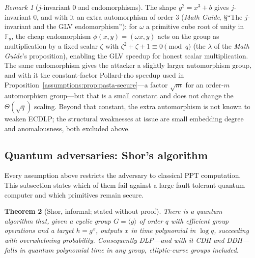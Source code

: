 \documentclass[11pt,a4paper]{article}
\newtheorem{theorem}{Theorem}[section]
\theoremstyle{definition}
\theoremstyle{remark}
\newtheorem{remark}[theorem]{Remark}
\newcommand{\Fp}{\ensuremath{\mathbb{F}_{p}}}
\begin{document}
\begin{remark}[\(j\)-invariant \(0\) and endomorphisms]
\label{assumptions:rem:j0}
The shape \(y^{2} = x^{3} + b\) gives \(j\)-invariant \(0\), and
with it an extra automorphism of order \(3\) (\emph{Math Guide},
\S``The \(j\)-invariant and the GLV endomorphism''): for \(\omega\) a
primitive cube root of unity in \(\Fp\), the cheap endomorphism
\(\phi(x, y) = (\omega x, y)\) acts on the group as multiplication
by a fixed scalar \(\zeta\) with
\(\zeta^{2} + \zeta + 1 \equiv 0 \pmod q\) (the \(\lambda\) of the
\emph{Math Guide}'s proposition), enabling the GLV speedup for honest
scalar multiplication. The same endomorphism gives the attacker a
slightly larger automorphism group, and with it the constant-factor
Pollard-rho speedup used in
Proposition~\ref{assumptions:prop:pasta-secure}---a factor \(\sqrt m\)
for an order-\(m\) automorphism group---but that is a small constant
and does not change the \(\Theta(\sqrt q)\) scaling. Beyond that
constant, the extra automorphism is not known to weaken ECDLP; the
structural weaknesses at issue are small embedding degree and
anomalousness, both excluded above.
\end{remark}

\subsection{Quantum adversaries: Shor's algorithm}
\label{assumptions:subsec:quantum}

Every assumption above restricts the adversary to classical PPT
computation. This subsection states which of them fail against a
large fault-tolerant quantum computer and which primitives remain
secure.

\begin{theorem}[Shor, informal; stated without proof]
\label{assumptions:thm:shor}
There is a quantum algorithm that, given a cyclic group
\(G = \langle g\rangle\) of order \(q\) with efficient group
operations and a target \(h = g^{x}\), outputs \(x\) in time
polynomial in \(\log q\), succeeding with overwhelming probability.
Consequently DLP---and with it CDH and DDH---falls in quantum
polynomial time in \emph{any} group, elliptic-curve groups included.
\end{theorem}
\end{document}
